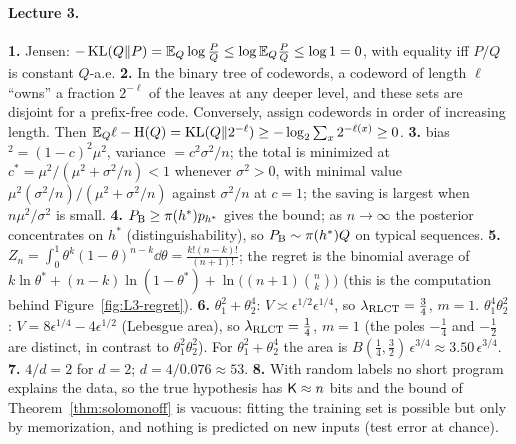 \paragraph{Lecture 3.}
\textbf{1.} Jensen: $-\operatorname{KL}(Q\|P)=\mathbb{E}_Q\log\frac{P}{Q}\le\log\mathbb{E}_Q\frac PQ\le\log1=0$, with equality iff $P/Q$ is constant $Q$-a.e. \quad
\textbf{2.} In the binary tree of codewords, a codeword of length $\ell$ ``owns'' a fraction $2^{-\ell}$ of the leaves at any deeper level, and these sets are disjoint for a prefix-free code. Conversely, assign codewords in order of increasing length. Then $\mathbb{E}_Q\ell-\mathrm{H}(Q)=\operatorname{KL}(Q\|2^{-\ell})\ge-\log_2\sum_x2^{-\ell(x)}\ge0$. \quad
\textbf{3.} bias$^2=(1-c)^2\mu^2$, variance $=c^2\sigma^2/n$; the total is minimized at $c^*=\mu^2/(\mu^2+\sigma^2/n)<1$ whenever $\sigma^2>0$, with minimal value $\mu^2(\sigma^2/n)/(\mu^2+\sigma^2/n)$ against $\sigma^2/n$ at $c=1$; the saving is largest when $n\mu^2/\sigma^2$ is small. \quad
\textbf{4.} $P_{\mathrm{B}}\ge\pi(h^*)p_{h^*}$ gives the bound; as $n\to\infty$ the posterior concentrates on $h^*$ (distinguishability), so $P_{\mathrm{B}}\sim\pi(h^*)Q$ on typical sequences. \quad
\textbf{5.} $Z_n=\int_0^1\theta^k(1-\theta)^{n-k}\dd\theta=\frac{k!(n-k)!}{(n+1)!}$; the regret is the binomial average of $k\ln\theta^*+(n-k)\ln(1-\theta^*)+\ln\big((n+1)\binom nk\big)$ (this is the computation behind Figure~\ref{fig:L3-regret}). \quad
\textbf{6.} $\theta_1^2+\theta_2^4$: $V\asymp\epsilon^{1/2}\epsilon^{1/4}$, so $\lambda_{\mathrm{RLCT}}=\tfrac34$, $m=1$. $\theta_1^4\theta_2^2$: $V=8\epsilon^{1/4}-4\epsilon^{1/2}$ (Lebesgue area), so $\lambda_{\mathrm{RLCT}}=\tfrac14$, $m=1$ (the poles $-\tfrac14$ and $-\tfrac12$ are distinct, in contrast to $\theta_1^2\theta_2^2$). For $\theta_1^2+\theta_2^4$ the area is $B(\tfrac14,\tfrac32)\,\epsilon^{3/4}\approx3.50\,\epsilon^{3/4}$. \quad
\textbf{7.} $4/d=2$ for $d=2$; $d=4/0.076\approx53$. \quad
\textbf{8.} With random labels no short program explains the data, so the true hypothesis has $\mathsf{K}\approx n$ bits and the bound of Theorem~\ref{thm:solomonoff} is vacuous: fitting the training set is possible but only by memorization, and nothing is predicted on new inputs (test error at chance).
